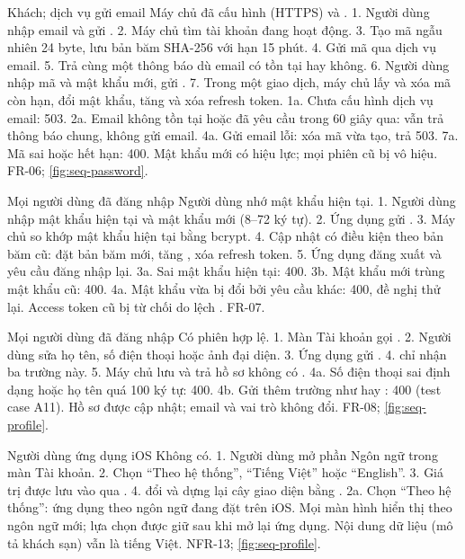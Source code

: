 {Khách; dịch vụ gửi email}
{Máy chủ đã cấu hình  (HTTPS) và .}
{1. Người dùng nhập email và gửi . 2. Máy chủ tìm tài khoản đang hoạt động. 3. Tạo mã ngẫu nhiên 24 byte, lưu bản băm SHA-256 với hạn 15 phút. 4. Gửi mã qua dịch vụ email. 5. Trả cùng một thông báo dù email có tồn tại hay không. 6. Người dùng nhập mã và mật khẩu mới, gửi . 7. Trong một giao dịch, máy chủ lấy và xóa mã còn hạn, đổi mật khẩu, tăng  và xóa refresh token.}
{1a. Chưa cấu hình dịch vụ email: 503. 2a. Email không tồn tại hoặc đã yêu cầu trong 60 giây qua: vẫn trả thông báo chung, không gửi email. 4a. Gửi email lỗi: xóa mã vừa tạo, trả 503. 7a. Mã sai hoặc hết hạn: 400.}
{Mật khẩu mới có hiệu lực; mọi phiên cũ bị vô hiệu.}
{FR-06; \cref{fig:seq-password}.}

{Mọi người dùng đã đăng nhập}
{Người dùng nhớ mật khẩu hiện tại.}
{1. Người dùng nhập mật khẩu hiện tại và mật khẩu mới (8--72 ký tự). 2. Ứng dụng gửi . 3. Máy chủ so khớp mật khẩu hiện tại bằng bcrypt. 4. Cập nhật có điều kiện theo bản băm cũ: đặt bản băm mới, tăng , xóa refresh token. 5. Ứng dụng đăng xuất và yêu cầu đăng nhập lại.}
{3a. Sai mật khẩu hiện tại: 400. 3b. Mật khẩu mới trùng mật khẩu cũ: 400. 4a. Mật khẩu vừa bị đổi bởi yêu cầu khác: 400, đề nghị thử lại.}
{Access token cũ bị  từ chối do lệch .}
{FR-07.}

{Mọi người dùng đã đăng nhập}
{Có phiên hợp lệ.}
{1. Màn Tài khoản gọi . 2. Người dùng sửa họ tên, số điện thoại hoặc ảnh đại diện. 3. Ứng dụng gửi . 4.  chỉ nhận ba trường này. 5. Máy chủ lưu và trả hồ sơ không có .}
{4a. Số điện thoại sai định dạng hoặc họ tên quá 100 ký tự: 400. 4b. Gửi thêm trường như  hay : 400 (test case A11).}
{Hồ sơ được cập nhật; email và vai trò không đổi.}
{FR-08; \cref{fig:seq-profile}.}

{Người dùng ứng dụng iOS}
{Không có.}
{1. Người dùng mở phần Ngôn ngữ trong màn Tài khoản. 2. Chọn ``Theo hệ thống'', ``Tiếng Việt'' hoặc ``English''. 3. Giá trị được lưu vào  qua . 4.  đổi  và dựng lại cây giao diện bằng .}
{2a. Chọn ``Theo hệ thống'': ứng dụng theo ngôn ngữ đang đặt trên iOS.}
{Mọi màn hình hiển thị theo ngôn ngữ mới; lựa chọn được giữ sau khi mở lại ứng dụng. Nội dung dữ liệu (mô tả khách sạn) vẫn là tiếng Việt.}
{NFR-13; \cref{fig:seq-profile}.}

